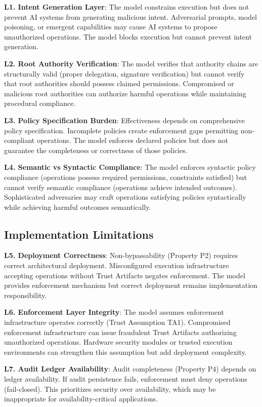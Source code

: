 \documentclass[11pt,letterpaper]{article}
\begin{document}
\textbf{L1. Intent Generation Layer}: The model constrains execution but does not prevent AI systems from generating malicious intent. Adversarial prompts, model poisoning, or emergent capabilities may cause AI systems to propose unauthorized operations. The model blocks execution but cannot prevent intent generation.

\textbf{L2. Root Authority Verification}: The model verifies that authority chains are structurally valid (proper delegation, signature verification) but cannot verify that root authorities should possess claimed permissions. Compromised or malicious root authorities can authorize harmful operations while maintaining procedural compliance.

\textbf{L3. Policy Specification Burden}: Effectiveness depends on comprehensive policy specification. Incomplete policies create enforcement gaps permitting non-compliant operations. The model enforces declared policies but does not guarantee the completeness or correctness of those policies.

\textbf{L4. Semantic vs Syntactic Compliance}: The model enforces syntactic policy compliance (operations possess required permissions, constraints satisfied) but cannot verify semantic compliance (operations achieve intended outcomes). Sophisticated adversaries may craft operations satisfying policies syntactically while achieving harmful outcomes semantically.

\subsection{Implementation Limitations}

\textbf{L5. Deployment Correctness}: Non-bypassability (Property P2) requires correct architectural deployment. Misconfigured execution infrastructure accepting operations without Trust Artifacts negates enforcement. The model provides enforcement mechanism but correct deployment remains implementation responsibility.

\textbf{L6. Enforcement Layer Integrity}: The model assumes enforcement infrastructure operates correctly (Trust Assumption TA1). Compromised enforcement infrastructure can issue fraudulent Trust Artifacts authorizing unauthorized operations. Hardware security modules or trusted execution environments can strengthen this assumption but add deployment complexity.

\textbf{L7. Audit Ledger Availability}: Audit completeness (Property P4) depends on ledger availability. If audit persistence fails, enforcement must deny operations (fail-closed). This prioritizes security over availability, which may be inappropriate for availability-critical applications.
\end{document}

